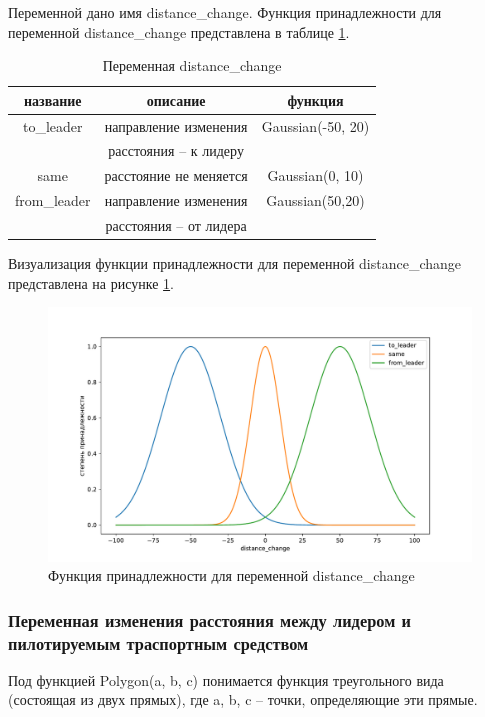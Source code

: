 \documentclass[12pt]{report}
\begin{document}
Переменной дано имя distance\_change. 
Функция принадлежности для переменной distance\_change представлена в таблице  \ref{table:distance_ch}.

\begin{table} [h!]
	\caption{Переменная distance\_change} 
 \label{table:distance_ch}
	\begin{center}
	\begin{tabular}{|c c c|}
\hline название  & описание  & функция \\
\hline to\_leader & направление изменения & Gaussian(-50, 20) \\
  &  расстояния -- к лидеру  &  \\

\hline same & расстояние не меняется & Gaussian(0, 10) \\
\hline from\_leader & направление изменения & Gaussian(50,20) \\
  &  расстояния -- от лидера  &  \\
\hline
	\end{tabular}
	\end{center}
\end{table}

Визуализация функции принадлежности для переменной distance\_change представлена на рисунке \ref{fig:var_dist_ch}.

\begin{figure}[h!]
  \centering
  \includegraphics[width = \linewidth]{variable_distance_change.pdf}
  \caption{Функция принадлежности для переменной distance\_change}
  \label{fig:var_dist_ch}
\end{figure}

\subsubsection{Переменная изменения расстояния между лидером и пилотируемым траспортным средством}
Под функцией Polygon(a, b, c) понимается функция треугольного вида (состоящая из двух прямых), где a, b, c -- точки, определяющие эти прямые. 
\end{document}
